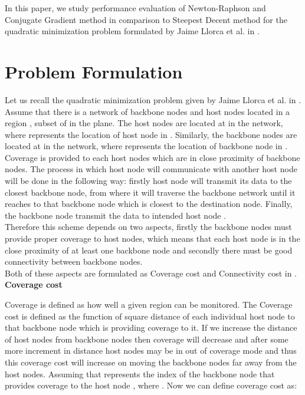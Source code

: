 \documentclass[11pt]{article}
\numberwithin{equation}{section}
\begin{document}
In this paper, we study performance evaluation of Newton-Raphson and Conjugate Gradient method in comparison to Steepest Decent method for the quadratic minimization problem formulated by Jaime Llorca et al. in \cite{lk}.


\section{Problem Formulation}
Let us recall the quadratic minimization problem  given by Jaime Llorca et al. in \cite{lk}. Assume that there is a network of  backbone nodes and  host nodes located in a region , subset of  in the plane. The host nodes are located at  in the network, where  represents the location of  host node in . Similarly, the backbone nodes are located at  in the network, where  represents the location of  backbone node in . Coverage is provided to each host nodes which are in close proximity of backbone nodes. The process in which host node  will communicate with another host node  will be done in the following way: firstly host node  will transmit its data to the closest backbone node, from where it will traverse the backbone network until it reaches to that backbone node which is closest to the destination node. Finally, the backbone node transmit the data to intended host node .\\


Therefore this scheme depends on two aspects, firstly the backbone nodes must provide proper coverage to host nodes, which means that each host node is in the close proximity of at least one backbone node and secondly there must be good connectivity between backbone nodes.\\

Both of these aspects are formulated as Coverage cost and Connectivity cost in \cite{lk}.\\

\noindent \textbf{Coverage cost}

Coverage is defined as how well a given region can be monitored. The Coverage cost is defined as the function of square distance of each individual host node to that backbone node which is providing coverage to it. If we increase the distance of host nodes from backbone nodes then coverage will decrease and after some more increment in distance host nodes may be in out of coverage mode and thus this coverage cost will increase on moving the backbone nodes far away from the host nodes. Assuming that  represents the index of the backbone node that provides coverage to the host node , where  . Now we can define coverage cost as:
\end{document}
